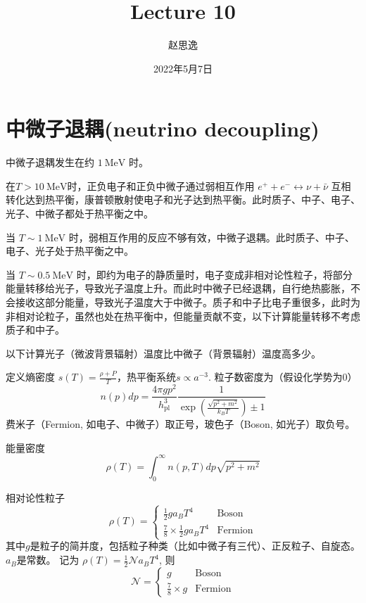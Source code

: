 \documentclass[12pt]{ctexart}
\title{Lecture 10}
\author{赵思逸}
\date{2022年5月7日}
\begin{document}
\maketitle


\section{中微子退耦(neutrino decoupling)}

中微子退耦发生在约 $1 \mathrm{~MeV}$ 时。

在$T> 10 \mathrm{~MeV}$时，正负电子和正负中微子通过弱相互作用 $e^+ + e^- \leftrightarrow \nu + \bar{\nu}$ 互相转化达到热平衡，康普顿散射使电子和光子达到热平衡。此时质子、中子、电子、光子、中微子都处于热平衡之中。

当 $T \sim 1 \mathrm{~MeV}$ 时，弱相互作用的反应不够有效，中微子退耦。此时质子、中子、电子、光子处于热平衡之中。

当 $T \sim 0.5 \mathrm{~MeV}$ 时，即约为电子的静质量时，电子变成非相对论性粒子，将部分能量转移给光子，导致光子温度上升。而此时中微子已经退耦，自行绝热膨胀，不会接收这部分能量，导致光子温度大于中微子。质子和中子比电子重很多，此时为非相对论粒子，虽然也处在热平衡中，但能量贡献不变，以下计算能量转移不考虑质子和中子。

以下计算光子（微波背景辐射）温度比中微子（背景辐射）温度高多少。

定义熵密度 $s(T) = \frac{\rho+P}{T}$，热平衡系统$s\propto a^{-3}$.
粒子数密度为（假设化学势为0）
\begin{equation}
    n(p) dp = \frac{4\pi g p^2}{h_{\mathrm{pl}}^3} \frac{1}{\exp\left(\frac{\sqrt{p^2+m^2}}{k_B T}\right) \pm 1}
\end{equation}
费米子（Fermion, 如电子、中微子）取正号，玻色子（Boson, 如光子）取负号。

能量密度
\begin{equation}
    \rho (T) = \int_0^\infty n(p,T) dp \sqrt{p^2+m^2}
\end{equation}

相对论性粒子
\begin{equation}
    \rho(T) =
    \begin{cases}
        \frac{1}{2} g a_B T^4   & \text{Boson} \\ 
        \frac{7}{8} \times \frac{1}{2} g a_B T^4 & \text{Fermion}
    \end{cases}
\end{equation}
其中$g$是粒子的简并度，包括粒子种类（比如中微子有三代）、正反粒子、自旋态。$a_B$是常数。
记为 $\rho(T) = \frac{1}{2} \mathcal{N} a_B T^4 $, 则
\begin{equation}
    \mathcal{N} =
    \begin{cases}
        g  & \text{Boson} \\ 
        \frac{7}{8} \times g  & \text{Fermion}
    \end{cases}
\end{equation}
\end{document}
